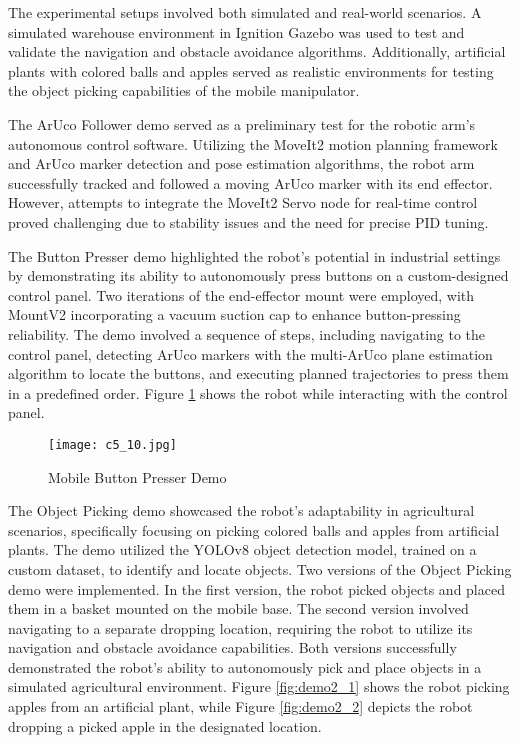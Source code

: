 The experimental setups involved both simulated and real-world scenarios. A simulated warehouse environment
in Ignition Gazebo was used to test and validate the navigation and obstacle avoidance algorithms. 
Additionally, artificial plants with colored balls and apples served as realistic environments for testing
the object picking capabilities of the mobile manipulator.

The ArUco Follower demo served as a preliminary test for the robotic arm's autonomous control software. 
Utilizing the MoveIt2 motion planning framework and ArUco marker detection and pose estimation algorithms, 
the robot arm successfully tracked and followed a moving ArUco marker with its end effector. However, 
attempts to integrate the MoveIt2 Servo node for real-time control proved challenging due to stability issues
and the need for precise PID tuning.

The Button Presser demo highlighted the robot's potential in industrial settings by demonstrating its ability 
to autonomously press buttons on a custom-designed control panel. Two iterations of the end-effector mount were employed,
with MountV2 incorporating a vacuum suction cap to enhance button-pressing reliability. The demo involved a 
sequence of steps, including navigating to the control panel, detecting ArUco markers with the 
multi-ArUco plane estimation algorithm to locate the buttons, 
and executing planned trajectories to press them in a predefined order. Figure \ref{fig:buttonpresser} shows the robot
while interacting with the control panel.

\begin{figure}[t]
    \centering
    \texttt{[image: c5\_10.jpg]}
    \caption{Mobile Button Presser Demo}
    \label{fig:buttonpresser}
\end{figure}

The Object Picking demo showcased the robot's adaptability in agricultural scenarios, specifically focusing 
on picking colored balls and apples from artificial plants. The demo utilized the YOLOv8 object detection model,
trained on a custom dataset, to identify and locate objects.
Two versions of the Object Picking demo were implemented. In the first version, the robot picked objects and 
placed them in a basket mounted on the mobile base. The second version involved navigating to a separate dropping 
location, requiring the robot to utilize its navigation and obstacle avoidance capabilities. Both versions 
successfully demonstrated the robot's ability to autonomously pick and place objects in a simulated agricultural 
environment. Figure \ref{fig:demo2_1} shows the robot picking apples from an artificial plant, 
while Figure \ref{fig:demo2_2} depicts the robot dropping a picked apple in the designated location.

